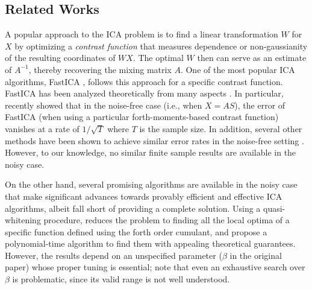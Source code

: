 \documentclass[twoside,11pt]{article}
\begin{document}
\subsection{Related Works}
\label{subsec:relatedWorks}
A popular approach to the ICA problem is to find a linear transformation $W$ for $X$ by optimizing a \emph{contrast function} 
that measures dependence or non-gaussianity of the resulting coordinates of $WX$.
The optimal $W$ then can serve as an estimate of $A^{-1}$, thereby recovering the mixing matrix $A$.
One of the most popular ICA algorithms, FastICA \citep{hyvarinen1999fast},
follows this approach for a specific contrast function.  
FastICA has been analyzed theoretically from many aspects \citep{tichavsky2006performance,oja2006fastica,ollila2010deflation,dermoune2013fastica,wei2014convergence}.
In particular, recently \citet{miettinen2014fourth} showed  that in the noise-free case (i.e., when $X = AS$), the error of FastICA (when using a particular forth-moments-based contrast function) vanishes at a rate of $1/\sqrt{T}$ where $T$ is the sample size.
In addition, several other methods have been shown to achieve similar error rates in the noise-free setting \citep[e.g.,][]{eriksson2003characteristic,samarov2004nonparametric,chen2005consistent,chen2006efficient}.
However, to our knowledge, no similar finite sample results are available in the noisy case.


On the other hand, several promising algorithms are available in the noisy case that make significant advances towards provably efficient and effective ICA algorithms, albeit fall short of providing a complete solution. 
Using a quasi-whitening procedure, \citet{arora2012provable} reduces the problem to finding all the local optima of a specific function defined using the forth order cumulant, 
and propose a polynomial-time algorithm to find them with appealing theoretical guarantees. However, the results depend on an unspecified parameter ($\beta$ in the original paper) whose proper tuning is essential; note that even an exhaustive search over $\beta$ is problematic, since its valid range is not well understood.
\end{document}
